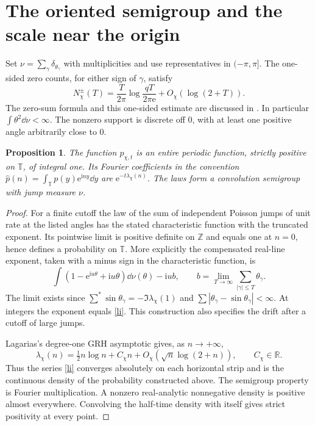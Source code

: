 \documentclass[11pt,letterpaper]{article}
\newcommand{\R}{\mathbb R}\newcommand{\T}{\mathbb T}\newcommand{\Z}{\mathbb Z}
\newcommand{\I}{\mathrm i}\newcommand{\e}{\mathrm e}
\newcommand{\wh}{\widehat}\newcommand{\one}{\mathbf 1}
\theoremstyle{plain}
\newtheorem{proposition}[theorem]{Proposition}\newtheorem{corollary}[theorem]{Corollary}
\theoremstyle{definition}\newtheorem{example}[theorem]{Example}
\begin{document}
\section{The oriented semigroup and the scale near the origin}\label{construction}
Set $\nu=\sum_\gamma\delta_{\theta_\gamma}$ with multiplicities and use representatives in $(-\pi,\pi]$. The one-sided zero counts, for either sign of $\gamma$, satisfy
\begin{equation}\label{rv}
 N_\chi^\pm(T)=\frac{T}{2\pi}\log\frac{qT}{2\pi\e}+O_\chi(\log(2+T)).
\end{equation}
The zero-sum formula and this one-sided estimate are discussed in \cite[Theorems 1.1 and 2.1]{lagarias}. In particular $\int\theta^2\dd\nu<\infty$. The nonzero support is discrete off $0$, with at least one positive angle arbitrarily close to $0$.

\begin{proposition}\label{process}
The function $p_{\chi,t}$ is an entire periodic function, strictly positive on $\T$, of integral one. Its Fourier coefficients in the convention $\wh p(n)=\int_\T p(y)\e^{\I ny}\dd y$ are $\e^{-t\lambda_\chi(n)}$. The laws form a convolution semigroup with jump measure $\nu$.
\end{proposition}
\begin{proof}
For a finite cutoff the law of the sum of independent Poisson jumps of unit rate at the listed angles has the stated characteristic function with the truncated exponent. Its pointwise limit is positive definite on $\Z$ and equals one at $n=0$, hence defines a probability on $\T$. More explicitly the compensated real-line exponent, taken with a minus sign in the characteristic function, is
\[
 \int(1-\e^{\I u\theta}+\I u\theta)\dd\nu(\theta)-\I ub,\qquad
 b=\lim_{T\to\infty}\sum_{|\gamma|\le T}\theta_\gamma.
\]
The limit exists since $\sum^*\sin\theta_\gamma=-\Im\lambda_\chi(1)$ and $\sum|\theta_\gamma-\sin\theta_\gamma|<\infty$. At integers the exponent equals \eqref{li}. This construction also specifies the drift after a cutoff of large jumps.

Lagarias's degree-one GRH asymptotic gives, as $n\to+\infty$,
\begin{equation}\label{asym}
 \lambda_\chi(n)=\tfrac12 n\log n+C_\chi n+O_\chi(\sqrt n\log(2+n)),
 \qquad C_\chi\in\R .
\end{equation}
Thus the series \eqref{li} converges absolutely on each horizontal strip and is the continuous density of the probability constructed above. The semigroup property is Fourier multiplication. A nonzero real-analytic nonnegative density is positive almost everywhere. Convolving the half-time density with itself gives strict positivity at every point.
\end{proof}
\end{document}
